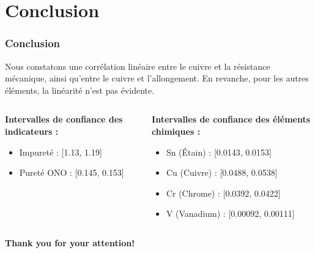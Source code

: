 \documentclass[aspectratio=169]{beamer}
\begin{document}
\section{Conclusion}


\begin{frame}
\frametitle{Conclusion}
Nous constatons une corrélation linéaire entre le cuivre et la résistance mécanique, ainsi qu'entre le cuivre et l'allongement. En revanche, pour les autres éléments, la linéarité n'est pas  évidente.

\vspace{5pt}

\begin{columns}[t]
\begin{column}{0.5\textwidth}
\textbf{Intervalles de confiance des indicateurs :}
    \begin{itemize}
    \item Impureté : [1.13, 1.19]
    \item Pureté ONO : [0.145, 0.153]
    \end{itemize}
\end{column}
\begin{column}{0.5\textwidth}
\textbf{Intervalles de confiance des éléments chimiques :}
    \begin{itemize}
    \item Sn (Étain) : [0.0143, 0.0153]
    \item Cu (Cuivre) : [0.0488, 0.0538]
    \item Cr (Chrome) : [0.0392, 0.0422]
    \item V (Vanadium) : [0.00092, 0.00111]
    \end{itemize}
\end{column}
\end{columns}
\end{frame}

\begin{frame}
    \begin{center}
        \vfill
        {\Large \bf Thank you for your attention!}\\
    \end{center}
\end{frame}




%    
%     

\end{document}
